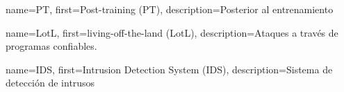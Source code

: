   {name={PT}, first={Post-training (PT)},   description={Posterior al entrenamiento}}


  {name={LotL}, first={living-off-the-land (LotL)},   description={Ataques a través de programas confiables.}}

    {name={IDS}, first={Intrusion Detection System (IDS)},          description={Sistema de detección de intrusos}}

